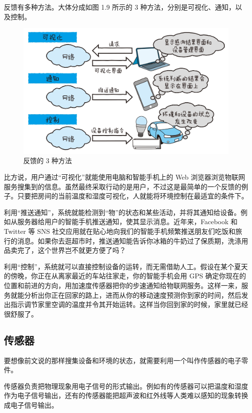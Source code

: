 \documentclass[12pt,UTF8]{ctexbook}
\begin{document}
反馈有多种方法。大体分成如图 1.9 所示的 3 种方法，分别是可视化、通知，以及控制。

\begin{figure}[htbp]
	\centering
	\includegraphics[width=1\linewidth]{9}
	\caption{反馈的 3 种方法}
	\label{fig:1}
\end{figure}

比方说，用户通过“可视化”就能使用电脑和智能手机上的 Web 浏览器浏览物联网服务搜集到的信息。虽然最终采取行动的是用户，不过这是最简单的一个反馈的例子。只要把房间的当前温度和湿度可视化，人就能将环境控制在最适宜的条件下。

利用“推送通知”，系统就能检测到“物”的状态和某些活动，并将其通知给设备。例如从服务器给用户的智能手机推送通知，使其显示消息。近年来，Facebook 和 Twitter 等 SNS 社交应用就在贴心地向我们的智能手机频繁推送朋友们吃饭和旅行的消息。如果你去逛超市时，推送通知能告诉你冰箱的牛奶过了保质期，洗涤用品卖完了，这个世界岂不就更方便了吗？

利用“控制”，系统就可以直接控制设备的运转，而无需借助人工。假设在某个夏天的傍晚，你正在从离家最近的车站往家走，你的智能手机会用 GPS 确定你现在的位置和前进的方向，用加速度传感器把你的步速通知给物联网服务。这样一来，服务就能分析出你正在回家的路上，进而从你的移动速度预测你到家的时间，然后发出指示调节家里空调的温度并令其开始运转。这样当你回到家的时候，家里就已经很舒服了。

\subsection{传感器}

要想像前文说的那样搜集设备和环境的状态，就需要利用一个叫作传感器的电子零件。

传感器负责把物理现象用电子信号的形式输出。例如有的传感器可以把温度和湿度作为电子信号输出，还有的传感器能把超声波和红外线等人类难以感知的现象转换成电子信号输出。
\end{document}
